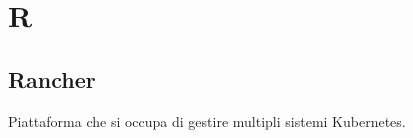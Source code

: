 \section*{R}
\markright{}
\subsection*{Rancher}
Piattaforma che si occupa di gestire multipli sistemi Kubernetes.